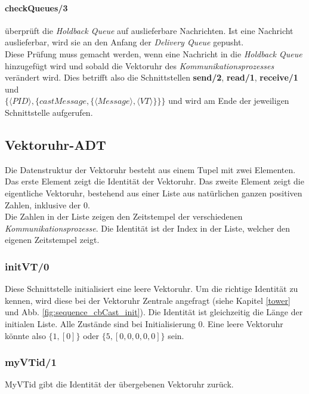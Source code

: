 \paragraph{checkQueues/3} überprüft die \textit{Holdback Queue} auf auslieferbare Nachrichten. Ist eine Nachricht auslieferbar, wird sie an den Anfang der \textit{Delivery Queue} gepusht.\\
Diese Prüfung muss gemacht werden, wenn eine Nachricht in die \textit{Holdback Queue} hinzugefügt wird und sobald die Vektoruhr des \textit{Kommunikationsprozesses} verändert wird. Dies betrifft also die Schnittstellen \textbf{send/2}, \textbf{read/1}, \textbf{receive/1} und\\ $\{\langle PID \rangle,\{castMessage,\{\langle Message \rangle, \langle VT \rangle\}\}\}$ und wird am Ende der jeweiligen Schnittstelle aufgerufen.

\subsection{Vektoruhr-ADT} \label{vectorC_entwurf}

Die Datenstruktur der Vektoruhr besteht aus einem Tupel mit zwei Elementen. Das erste Element zeigt die Identität der Vektoruhr. Das zweite Element zeigt die eigentliche Vektoruhr, bestehend aus einer Liste aus natürlichen ganzen positiven Zahlen, inklusive der 0.\\
Die Zahlen in der Liste zeigen den Zeitstempel der verschiedenen \textit{Kommunikationsprozesse}. Die Identität ist der Index in der Liste, welcher den eigenen Zeitstempel zeigt.

\subsubsection{initVT/0}

Diese Schnittstelle initialisiert eine leere Vektoruhr. Um die richtige Identität zu kennen, wird diese bei der Vektoruhr Zentrale angefragt (siehe Kapitel \ref{tower} und Abb. \ref{fig:sequence_cbCast_init}). Die Identität ist gleichzeitig die Länge der initialen Liste. Alle Zustände sind bei Initialisierung 0. Eine leere Vektoruhr könnte also $\{1, [0]\}$ oder $\{5, [0,0,0,0,0]\}$ sein.

\subsubsection{myVTid/1}

MyVTid gibt die Identität der übergebenen Vektoruhr zurück. 

